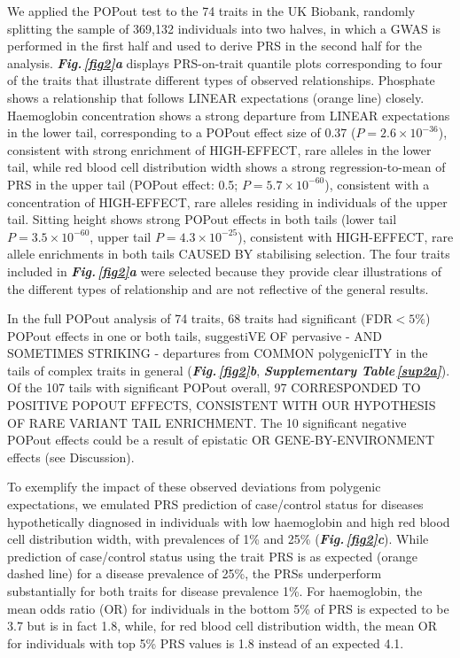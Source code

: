 \documentclass[12pt]{zHenriquesLab-StyleBioRxiv}
\newcommand\dref[2]{\normalsize{\textbf{\textit{Fig.\,\ref{#1}#2}}}\normalsize{}}
\newcommand\stref[1]{\normalsize{\textbf{\textit{Supplementary Table\,\ref{#1}}}}\normalsize{}}
\begin{document}
{{We applied the POPout test to the 74 traits in the UK Biobank, 
randomly splitting the sample of 369,132 individuals into two halves, 
in which a GWAS is performed in the first half and used to derive 
PRS in the second half for the analysis. 
\dref{fig2}{a}  displays PRS-on-trait quantile plots corresponding 
to four of the traits that illustrate different types of 
observed relationships. Phosphate shows a relationship that 
follows LINEAR expectations (orange line) closely. 
Haemoglobin concentration shows a strong departure from 
LINEAR expectations in the lower tail, corresponding 
to a POPout effect size of 0.37 ($P = 2.6 \times 10^{-36}$), 
consistent with strong enrichment of HIGH-EFFECT, rare alleles in the lower 
tail, while red blood cell distribution width shows a strong 
regression-to-mean of PRS in the upper tail (POPout effect: 
0.5; $P = 5.7 \times 10^{-60}$), consistent with a concentration
of HIGH-EFFECT, rare alleles residing in individuals of 
the upper tail. Sitting height shows strong POPout effects in both 
tails (lower tail $P = 3.5 \times 10^{-60}$, upper 
tail $P = 4.3 \times 10^{-25}$), consistent with HIGH-EFFECT, rare allele 
enrichments in both tails CAUSED BY stabilising selection. The four 
traits included in \dref{fig2}{a}  were selected because they provide clear illustrations 
of the different types of relationship and are not reflective of 
the general results. 

In the full POPout analysis of 74 traits, 
68 traits had significant (FDR$<5\%$) POPout effects in one or both 
tails, suggestiVE OF pervasive - AND SOMETIMES STRIKING - departures from COMMON polygenicITY 
in the tails of complex traits in general (\dref{fig2}{b}, \stref{sup2a}). 
Of the 107 tails with significant 
POPout overall, 97 CORRESPONDED TO POSITIVE POPOUT 
EFFECTS, CONSISTENT WITH OUR HYPOTHESIS OF RARE 
VARIANT TAIL ENRICHMENT. The 10 significant negative POPout effects could be a result 
of epistatic OR GENE-BY-ENVIRONMENT effects (see Discussion).

To exemplify the impact of these observed deviations from 
polygenic expectations, we emulated PRS prediction of 
case/control status for diseases hypothetically diagnosed 
in individuals with low haemoglobin and high red blood cell 
distribution width, with prevalences of 1\% and 25\% (\dref{fig2}{c}). 
While prediction of case/control status using the trait PRS 
is as expected (orange dashed line) for a disease prevalence 
of 25\%, the PRSs underperform substantially for both 
traits for disease prevalence 1\%. For haemoglobin, the mean 
odds ratio (OR) for individuals in the bottom 5\% of PRS is 
expected to be 3.7 but is in fact 1.8, while, for red blood 
cell distribution width, the mean OR for individuals 
with top 5\% PRS values is 1.8 instead of an expected 4.1.
%
}}
\end{document}

